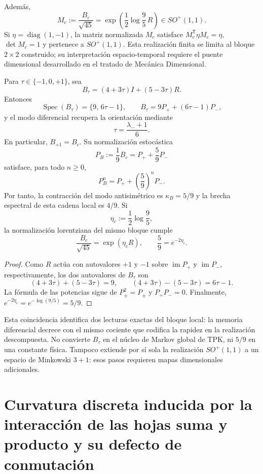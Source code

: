 Además,
\[
M_c:=\frac{B_c}{\sqrt{45}}
=\exp\left(\frac12\log\frac95\,R\right)
\in SO^+(1,1).
\]
Si \(\eta=\operatorname{diag}(1,-1)\), la matriz normalizada \(M_c\) satisface
\(M_c^{\mathsf T}\eta M_c=\eta\), \(\det M_c=1\) y pertenece a
\(SO^+(1,1)\). Esta realización finita se limita al bloque \(2\times2\)
construido; su interpretación espacio-temporal requiere el puente dimensional
desarrollado en el tratado de Mecánica Dimensional.

\begin{proposition}
\label{prop:app-trit-espectral-markov-lorentz-rev8}
Para \(\tau\in\{-1,0,+1\}\), sea
\[
 B_\tau=(4+3\tau)I+(5-3\tau)R.
\]
Entonces
\[
 \operatorname{Spec}(B_\tau)=\{9,\,6\tau-1\},
 \qquad
 B_\tau=9P_++(6\tau-1)P_-,
\]
y el modo diferencial recupera la orientación mediante
\[
 \tau=\frac{\lambda_-+1}{6}.
\]
En particular, \(B_{+1}=B_c\). Su normalización estocástica
\[
 P_B:=\frac{1}{9}B_c=P_++\frac59P_-
\]
satisface, para todo \(n\geq0\),
\[
 P_B^n=P_++\left(\frac59\right)^n P_-.
\]
Por tanto, la contracción del modo antisimétrico es
\(\kappa_B=5/9\) y la brecha espectral de esta cadena local es \(4/9\).
Si
\[
 \eta_c:=\frac12\log\frac95,
\]
la normalización lorentziana del mismo bloque cumple
\[
 \frac{B_c}{\sqrt{45}}=\exp(\eta_c R),
 \qquad
 \boxed{\frac59=e^{-2\eta_c}}.
\]
\end{proposition}

\begin{proof}
Como \(R\) actúa con autovalores \(+1\) y \(-1\) sobre
\(\operatorname{im}P_+\) y \(\operatorname{im}P_-\), respectivamente, los
dos autovalores de \(B_\tau\) son
\[
 (4+3\tau)+(5-3\tau)=9,\qquad
 (4+3\tau)-(5-3\tau)=6\tau-1.
\]
La fórmula de las potencias sigue de
\(P_\pm^2=P_\pm\) y \(P_+P_-=0\). Finalmente,
\(e^{-2\eta_c}=e^{-\log(9/5)}=5/9\).
\end{proof}

Esta coincidencia identifica dos lecturas exactas del bloque local: la
memoria diferencial decrece con el mismo cociente que codifica la rapidez
en la realización descompuesta. No convierte \(B_\tau\) en el núcleo de
Markov global de TPK, ni \(5/9\) en una constante física. Tampoco extiende
por sí sola la realización \(SO^+(1,1)\) a un espacio de Minkowski
\(3+1\): esos pasos requieren mapas dimensionales adicionales.

\section{Curvatura discreta inducida por la interacción de las hojas suma y producto y su defecto de conmutación}


